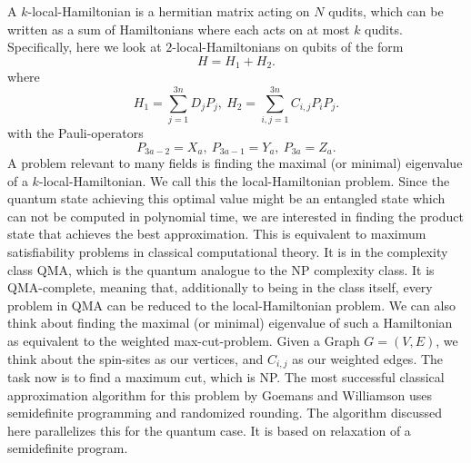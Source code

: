 A $k$-local-Hamiltonian is a hermitian matrix acting on $N$ qudits, which can be written as a sum of Hamiltonians where each acts on at most $k$ qudits.
Specifically, here we look at  $2$-local-Hamiltonians on qubits of the form \[
H = H_1+H_2
.\]
where \[
	H_1 = \sum_{j=1}^{3n} D_jP_j, ~ H_2  = \sum_{i,j=1}^{3n} C_{i,j}P_iP_j
.\]
with the Pauli-operators \[
	P_{3a-2}=X_a, ~ P_{3a-1}=Y_a, ~ P_{3a}=Z_a
.\]
A problem relevant to many fields  is finding the maximal (or minimal) eigenvalue of a $k$-local-Hamiltonian.
We call this the local-Hamiltonian problem.
Since the quantum state achieving this optimal value might be an entangled state which can not be computed in polynomial time, we are interested in finding the product state that achieves the best approximation. 
This is equivalent to maximum satisfiability problems in classical computational theory. 
It is in the complexity class QMA, which is the quantum analogue to the NP complexity class. 
It is QMA-complete, meaning that, additionally to being in the class itself, every problem in QMA can be reduced to the local-Hamiltonian problem.\cite{kempe06}
We can also think about finding the maximal (or minimal) eigenvalue of such a Hamiltonian as equivalent to the weighted max-cut-problem.
Given a Graph $G=(V,E)$, we think about the spin-sites as our vertices, and $C_{i,j}$ as our weighted edges.
The task now is to find a maximum cut, which is NP.
The most successful classical approximation algorithm for this problem by Goemans and Williamson uses semidefinite programming and randomized rounding. \cite{goemans95} 
The algorithm discussed here parallelizes this for the quantum case.
It is based on relaxation of a semidefinite program.

